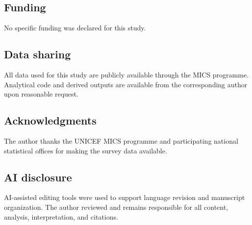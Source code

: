 \documentclass [11pt]{article}
\theoremstyle{plain}
\theoremstyle{definition}
\theoremstyle{remark}
\newcommand{\1}{\bm{1}}
\begin{document}
\subsection*{Funding}
No specific funding was declared for this study.

\subsection*{Data sharing}  
All data used for this study are publicly available through the MICS programme. Analytical code and derived outputs are available from the corresponding author upon reasonable request.

\subsection*{Acknowledgments}  
The author thanks the UNICEF MICS programme and participating national statistical offices for making the survey data available.

\subsection*{AI disclosure}
AI-assisted editing tools were used to support language revision and manuscript organization. The author reviewed and remains responsible for all content, analysis, interpretation, and citations.

\clearpage 





\clearpage   
\renewcommand\thefigure{\thesection.\arabic{figure}}   
\renewcommand\thetable{\thesection.\arabic{table}}   
\end{document}
